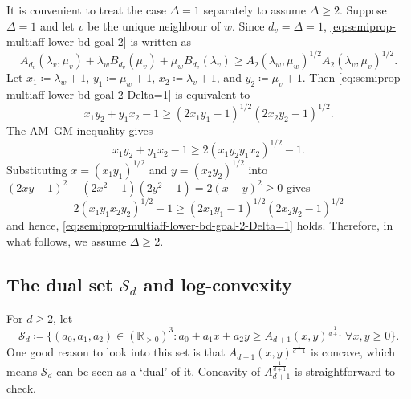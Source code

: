 \documentclass{article}
\numberwithin{equation}{section}
\theoremstyle{plain}
\theoremstyle{definition}
\theoremstyle{remark} %
\newcommand{\defeq}{\coloneqq}
\newcommand{\RR}{\mathbb{R}}
\newcommand{\calS}{\mathcal{S}}
\begin{document}
It is convenient to treat the case $\Delta=1$ separately to assume $\Delta\geq 2$.
Suppose $\Delta=1$ and let \(v\) be the unique neighbour of \(w\). Since \(d_v=\Delta=1\), \eqref{eq:semiprop-multiaff-lower-bd-goal-2} is written as
\begin{equation}\label{eq:semiprop-multiaff-lower-bd-goal-2-Delta=1}
    A_{d_v}(\lambda_v,\mu_v) + \lambda_w B_{d_v}(\mu_v) + \mu_w B_{d_v}(\lambda_v) \ge A_2(\lambda_w,\mu_w)^{1/2} A_2(\lambda_v,\mu_v)^{1/2}.
\end{equation}
Let \(x_1\defeq \lambda_w+1\), \(y_1\defeq \mu_w+1\), \(x_2\defeq \lambda_v+1\), and \(y_2\defeq \mu_v+1\). Then \eqref{eq:semiprop-multiaff-lower-bd-goal-2-Delta=1} is equivalent to
\[
    x_1y_2 + y_1x_2 - 1 \ge (2x_1y_1-1)^{1/2} (2x_2y_2-1)^{1/2}.
\]
The AM--GM inequality gives
\[
    x_1y_2 + y_1x_2 - 1 \ge 2(x_1y_2y_1x_2)^{1/2} - 1.
\]
Substituting \(x=(x_1y_1)^{1/2}\) and \(y=(x_2y_2)^{1/2}\) into \((2xy-1)^2 - (2x^2-1)(2y^2-1) = 2(x-y)^2 \ge0\) gives
\[
    2(x_1y_1x_2y_2)^{1/2} - 1 \ge (2x_1y_1 - 1)^{1/2} (2x_2y_2 - 1)^{1/2}
\]
and hence, \eqref{eq:semiprop-multiaff-lower-bd-goal-2-Delta=1} holds. Therefore, in what follows, we assume $\Delta\geq 2$.


\subsection{The dual set \texorpdfstring{\(\calS_d\)}{S\_d} and log-convexity}
For \(d\ge2\), let
\[
    \calS_d \defeq \{(a_0,a_1,a_2)\in(\RR_{>0})^3 : a_0+a_1x+a_2y\ge A_{d+1}(x,y)^{\frac{1}{d+1}}\ \forall x,y\ge0\}.
\]
One good reason to look into this set is that $A_{d+1}(x,y)^{\frac{1}{d+1}}$ is concave, which means $\calS_d$ can be seen as a `dual' of it. Concavity of $A_{d+1}^{\frac{1}{d+1}}$ is straightforward to check.
\end{document}
